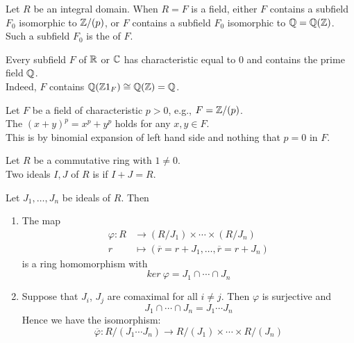 \begin{definition}
Let $R$ be an integral domain. When $R=F$ is a field, either $F$ contains a subfield $F_0$ isomorphic to $\mathbb{Z} /(p)$, or $F$ contains a subfield $F_0$ isomorphic to $\mathbb{Q} = \mathbb{Q} (\mathbb{Z})$.\\
Such a subfield $F_0$ is the  of $F$.
\end{definition}

\begin{remark}
Every subfield $F$ of $\mathbb{R}$ or $\mathbb{C}$ has characteristic equal to $0$ and contains the prime field $\mathbb{Q}$.\\
Indeed, $F$ contains $\mathbb{Q} (\mathbb{Z} 1_F) \cong \mathbb{Q} (\mathbb{Z}) = \mathbb{Q}$.
\end{remark}

\begin{proposition}
Let $F$ be a field of characteristic $p>0$, e.g., $F = \mathbb{Z} / (p)$.\\
The $(x+y)^p = x^p + y^p$ holds for any $x, y \in F$.\\
This is by binomial expansion of left hand side and nothing that $p=0$ in $F$.
\end{proposition}

\begin{definition}
Let $R$ be a commutative ring with $1 \neq 0$.\\
Two ideals $I, J$ of $R$ is  if $I+J = R$.	
\end{definition}

\begin{theorem}
 Let $J_1, \ldots, J_n$ be ideals of $R$. Then
\begin{enumerate}[label=(\roman*)]
\item The map
\begin{align}
	\varphi : R &\rightarrow (R/J_1) \times \cdots \times (R/J_n) \nonumber\\
	r &\mapsto (\overline{r} = r+J_1, \ldots, \overline{r}=r+J_n) \nonumber
\end{align}
is a ring homomorphism with
\begin{equation}
	ker \ \varphi = J_1 \cap \cdots \cap J_n \nonumber
\end{equation}
\item Suppose that $J_i$, $J_j$ are comaximal for all $i \neq j$. Then $\varphi$ is surjective and
\begin{equation}
	J_1 \cap \cdots \cap J_n = J_1 \cdots J_n \nonumber
\end{equation}
Hence we have the isomorphism:
\begin{equation}
	\overline{\varphi}: R/(J_1 \cdots J_n) \rightarrow R/(J_1) \times \cdots \times R/(J_n) \nonumber
\end{equation}
\end{enumerate}
\end{theorem}

